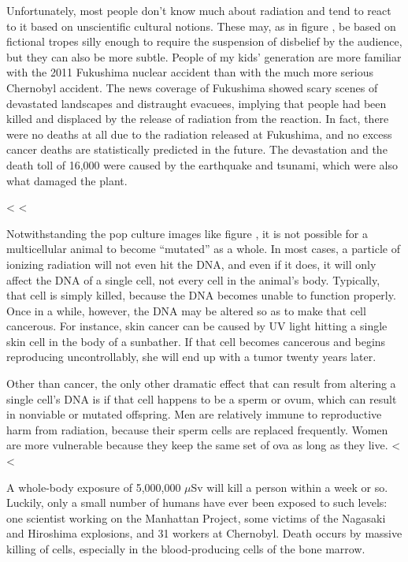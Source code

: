       Unfortunately, most people don't know much about radiation and tend to react to it based on 
      unscientific cultural notions. These may, as in figure , be based on
      fictional tropes silly enough to
      require the suspension of disbelief by the audience, but they can also be more subtle.
      People of my kids' generation are more familiar with the 2011 Fukushima nuclear accident
      than with the much more serious Chernobyl accident. The news coverage of Fukushima showed
      scary scenes of devastated landscapes and distraught evacuees, implying that people had been
      killed and displaced by the release of radiation from the reaction. In fact, there were no deaths
      at all due to the radiation released at Fukushima, and no excess cancer deaths are statistically
      predicted in the future. The devastation and the death toll of 16,000 were caused by the earthquake
      and tsunami, which were also what damaged the plant.

<%
<%

        Notwithstanding the pop culture images like figure , it is not possible for a multicellular
        animal to become ``mutated'' as a whole. In most cases, a
        particle of ionizing radiation will not even hit the DNA,
        and even if it does, it will only affect the DNA of a single
        cell, not every cell in the animal's body. Typically, that
        cell is simply killed, because the DNA becomes unable to
        function properly. Once in a while, however, the DNA may be
        altered so as to make that cell cancerous. For instance,
        skin cancer can be caused by UV light hitting a single skin
        cell in the body of a sunbather. If that cell becomes
        cancerous and begins reproducing uncontrollably, she will
        end up with a tumor twenty years later.

        Other than cancer, the only other dramatic effect that can
        result from altering a single cell's DNA is if that cell
        happens to be a sperm or ovum, which can result in nonviable
        or mutated offspring. Men are relatively immune to
        reproductive harm from radiation, because their sperm cells
        are replaced frequently. Women are more vulnerable because
        they keep the same set of ova as long as they live.
<%
<%

        A whole-body exposure of 5,000,000 $\mu$Sv 
        will kill a person
        within a week or so. Luckily, only a small number of humans
        have ever been exposed to such levels: one scientist working
        on the Manhattan  Project, some victims of the Nagasaki and
        Hiroshima explosions, and 31 workers at Chernobyl. Death
        occurs by massive killing of cells, especially in the
        blood-producing cells of the bone marrow.


